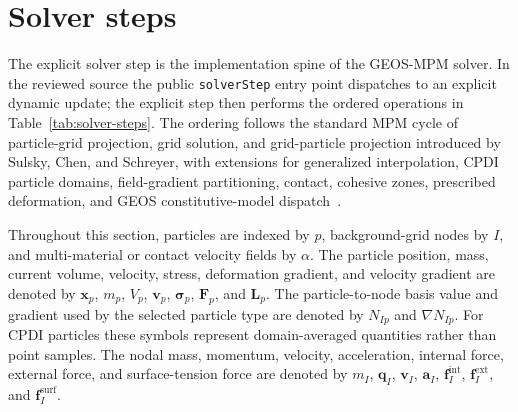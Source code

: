 \section{Solver steps}
\label{sec:solver-steps}
The explicit solver step is the implementation spine of the GEOS-MPM solver.  In the reviewed source the public \texttt{solverStep} entry point dispatches to an explicit dynamic update; the explicit step then performs the ordered operations in Table~\ref{tab:solver-steps}.  The ordering follows the standard MPM cycle of particle-grid projection, grid solution, and grid-particle projection introduced by Sulsky, Chen, and Schreyer, with extensions for generalized interpolation, CPDI particle domains, field-gradient partitioning, contact, cohesive zones, prescribed deformation, and GEOS constitutive-model dispatch~\cite{sulsky1994history,bardenhagen2004gimp,sadeghirad2011cpdi,homel2016domaindef,homel2016dfg}.

Throughout this section, particles are indexed by $p$, background-grid nodes by $I$, and multi-material or contact velocity fields by $\alpha$.  The particle position, mass, current volume, velocity, stress, deformation gradient, and velocity gradient are denoted by $\mathbf{x}_p$, $m_p$, $V_p$, $\mathbf{v}_p$, $\boldsymbol{\sigma}_p$, $\mathbf{F}_p$, and $\mathbf{L}_p$.  The particle-to-node basis value and gradient used by the selected particle type are denoted by $N_{Ip}$ and $\nabla N_{Ip}$.  For CPDI particles these symbols represent domain-averaged quantities rather than point samples.  The nodal mass, momentum, velocity, acceleration, internal force, external force, and surface-tension force are denoted by $m_I$, $\mathbf{q}_I$, $\mathbf{v}_I$, $\mathbf{a}_I$, $\mathbf{f}^{\mathrm{int}}_I$, $\mathbf{f}^{\mathrm{ext}}_I$, and $\mathbf{f}^{\mathrm{surf}}_I$.

